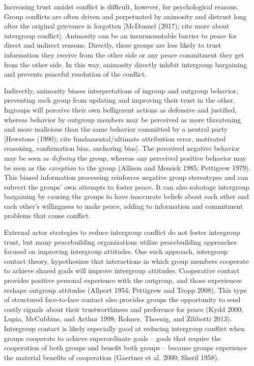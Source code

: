 \documentclass[11pt]{article}
\begin{document}
Increasing trust amidst conflict is difficult, however, for
psychological reasons. Group conflicts are often driven and perpetuated
by animosity and distrust long after the original grievance is forgotten
{[}McDonnel (2017); cite more about intergroup conflict{]}. Animosity
can be an insurmountable barrier to peace for direct and indirect
reasons. Directly, these groups are less likely to trust information
they receive from the other side or any peace commitment they get from
the other side. In this way, animosity directly inhibit intergroup
bargaining and prevents peaceful resolution of the conflict.

Indirectly, animosity biases interpretations of ingroup and outgroup
behavior, preventing each group from updating and improving their trust
in the other. Ingroups will perceive their own belligerent actions as
defensive and justified, whereas behavior by outgroup members may be
perceived as more threatening and more malicious than the same behavior
committed by a neutral party {[}Hewstone (1990); cite
fundamental/ultimate attribution error, motivated reasoning,
confirmation bias, anchoring bias{]}. The perceived negative behavior
may be seen as \emph{defining} the group, whereas any perceived positive
behavior may be seen as the \emph{exception} to the group (Allison and
Messick 1985; Pettigrew 1979). This biased information processing
reinforces negative group stereotypes and can subvert the groups' own
attempts to foster peace. It can also sabotage intergroup bargaining by
causing the groups to have inaccurate beliefs about each other and each
other's willingness to make peace, adding to information and commitment
problems that cause conflict.

External actor strategies to reduce intergroup conflict do not foster
intergroup trust, but many peacebuilding organizations utilize
peacebuilding approaches focused on improving intergroup attitudes. One
such approach, intergroup contact theory, hypothesizes that interactions
in which group members cooperate to achieve shared goals will improve
intergroup attitudes. Cooperative contact provides positive personal
experience with the outgroup, and those experiences reshape outgroup
attitudes (Allport 1954; Pettigrew and Tropp 2008). This type of
structured face-to-face contact also provides groups the opportunity to
send costly signals about their trustworthiness and preference for peace
(Kydd 2000; Lupia, McCubbins, and Arthur 1998; Rohner, Thoenig, and
Zilibotti 2013). Intergroup contact is likely especially good at
reducing intergroup conflict when groups cooperate to achieve
superordinate goals -- goals that require the cooperation of both groups
and benefit both groups -- because groups experience the material
benefits of cooperation (Gaertner et al. 2000; Sherif 1958).
\end{document}
